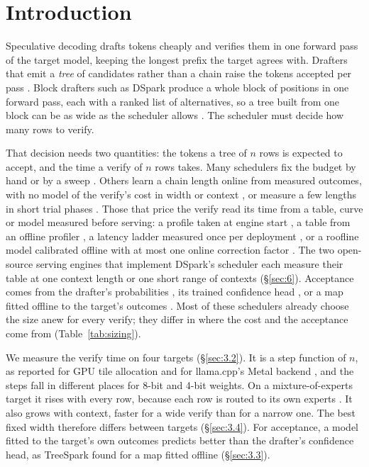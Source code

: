 \documentclass[10pt,twocolumn,letterpaper]{article}
\begin{document}
\section{Introduction}\label{sec:1}

Speculative decoding \cite{leviathan2023fast,chen2023accelerating} drafts tokens cheaply and verifies them in one forward pass of the target model, keeping the longest prefix the target agrees with. Drafters that emit a \emph{tree} of candidates rather than a chain raise the tokens accepted per pass \cite{cai2024medusa,li2024eagle,miao2024specinfer,li2024eagleb,wang2025opt}. Block drafters such as DSpark \cite{cheng2026dspark} produce a whole block of positions in one forward pass, each with a ranked list of alternatives, so a tree built from one block can be as wide as the scheduler allows \cite{zhou2026treespark,li2026chains}. The scheduler must decide how many rows to verify.

That decision needs two quantities: the tokens a tree of $n$ rows is expected to accept, and the time a verify of $n$ rows takes. Many schedulers fix the budget by hand or by a sweep \cite{li2026chains,shen2026draft,liu2026talon}. Others learn a chain length online from measured outcomes, with no model of the verify's cost in width or context \cite{saremi2026adaptivesd,hou2025banditspec,sun2026delay}, or measure a few lengths in short trial phases \cite{saxena2025utility}. Those that price the verify read its time from a table, curve or model measured before serving: a profile taken at engine start \cite{cheng2026dspark,kwon2023efficient,pan2026making}, a table from an offline profiler \cite{zheng2024sglang}, a latency ladder measured once per deployment \cite{zhou2026treespark}, or a roofline model calibrated offline with at most one online correction factor \cite{oh2026bastion}. The two open-source serving engines that implement DSpark's scheduler each measure their table at one context length or one short range of contexts (\S\ref{sec:6}). Acceptance comes from the drafter's probabilities \cite{pan2026making,oh2026bastion}, its trained confidence head \cite{cheng2026dspark,huang2025specdec}, or a map fitted offline to the target's outcomes \cite{zhou2026treespark,wang2026taps}. Most of these schedulers already choose the size anew for every verify; they differ in where the cost and the acceptance come from (Table~\ref{tab:sizing}).

We measure the verify time on four targets (\S\ref{sec:3.2}). It is a step function of $n$, as reported for GPU tile allocation \cite{cheng2026dspark,oh2026bastion} and for llama.cpp's Metal backend \cite{chordiya2026lossless}, and the steps fall in different places for 8-bit and 4-bit weights. On a mixture-of-experts target it rises with every row, because each row is routed to its own experts \cite{pan2026making,saxena2025utility,huang2025moesd}. It also grows with context, faster for a wide verify than for a narrow one. The best fixed width therefore differs between targets (\S\ref{sec:3.4}). For acceptance, a model fitted to the target's own outcomes predicts better than the drafter's confidence head, as TreeSpark \cite{zhou2026treespark} found for a map fitted offline (\S\ref{sec:3.3}).
\end{document}
